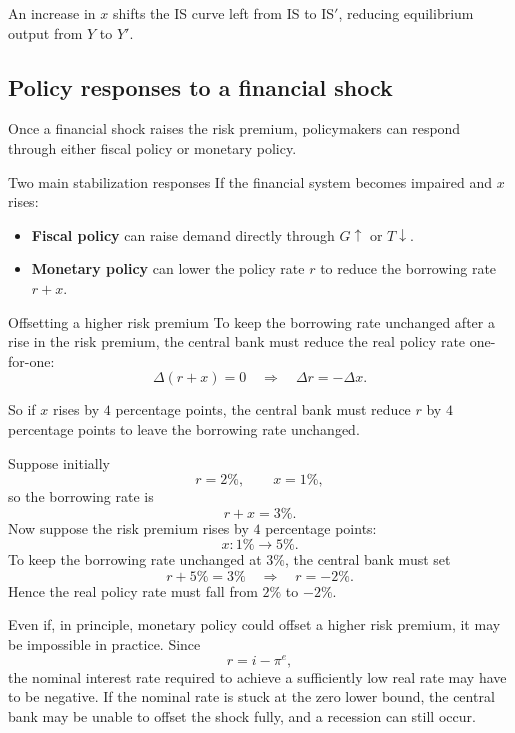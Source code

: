 \noindent
An increase in $x$ shifts the IS curve left from IS to IS$'$, reducing equilibrium output from $Y$ to $Y'$.

\subsection{Policy responses to a financial shock}

Once a financial shock raises the risk premium, policymakers can respond through either fiscal policy or monetary policy.

\begin{definition}{Two main stabilization responses}{}
If the financial system becomes impaired and $x$ rises:
\begin{itemize}[leftmargin=1.5em]
    \item \textbf{Fiscal policy} can raise demand directly through $G\uparrow$ or $T\downarrow$.
    \item \textbf{Monetary policy} can lower the policy rate $r$ to reduce the borrowing rate $r+x$.
\end{itemize}
\end{definition}

\begin{theorem}{Offsetting a higher risk premium}{}
To keep the borrowing rate unchanged after a rise in the risk premium, the central bank must reduce the real policy rate one-for-one:
\[
\Delta(r+x)=0
\quad\Longrightarrow\quad
\Delta r = -\Delta x.
\]
\end{theorem}

\noindent
So if $x$ rises by $4$ percentage points, the central bank must reduce $r$ by $4$ percentage points to leave the borrowing rate unchanged.

\begin{examplebox}[title={Worked Example: Monetary offset of a financial shock}]
Suppose initially
\[
r=2\%, \qquad x=1\%,
\]
so the borrowing rate is
\[
r+x=3\%.
\]
Now suppose the risk premium rises by $4$ percentage points:
\[
x: 1\% \to 5\%.
\]
To keep the borrowing rate unchanged at $3\%$, the central bank must set
\[
r + 5\% = 3\%
\quad\Longrightarrow\quad
r=-2\%.
\]
Hence the real policy rate must fall from $2\%$ to $-2\%$.
\end{examplebox}

\begin{policynote}[title={Policy Application: Why the zero lower bound matters}]
Even if, in principle, monetary policy could offset a higher risk premium, it may be impossible in practice. Since
\[
r=i-\pi^e,
\]
the nominal interest rate required to achieve a sufficiently low real rate may have to be negative. If the nominal rate is stuck at the zero lower bound, the central bank may be unable to offset the shock fully, and a recession can still occur.
\end{policynote}

